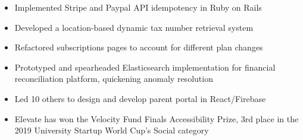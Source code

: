 \documentclass[10pt,a4paper,ragged2e]{altacv}
\begin{document}

\begin{fullwidth}
\makecvheader
\end{fullwidth}



\begin{itemize}
\item Implemented Stripe and Paypal API idempotency in Ruby on Rails
\item Developed a location-based dynamic tax number retrieval system
\item Refactored subscriptions pages to account for different plan changes
\item Prototyped and spearheaded Elasticsearch implementation for \break financial reconciliation platform, quickening anomaly resolution
\end{itemize}

\divider

\begin{itemize}
\item Led 10 others to design and develop parent portal in React/Firebase
\item Elevate has won the Velocity Fund Finals Accessibility Prize, \break 3rd place in the 2019 University Startup World Cup's Social category
\end{itemize}
\end{document}
